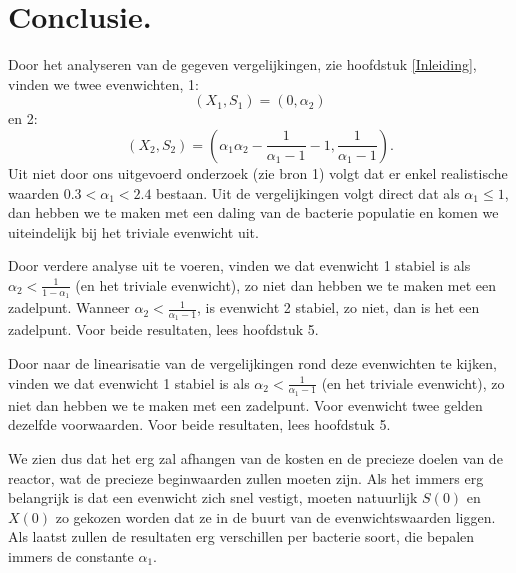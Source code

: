 
\chapter{Conclusie.}
Door het analyseren van de gegeven vergelijkingen, zie hoofdstuk \ref{Inleiding}, vinden we twee evenwichten, 1:
\[ 
	 (X_1, S_1) = (0, \alpha_2)
\]
en 2:
\[
	(X_2, S_2) =\left( \alpha_1\alpha_2 - \frac{1}{\alpha_1 - 1} - 1, \frac{1}{\alpha_1 - 1}\right).
\] 
Uit niet door ons uitgevoerd onderzoek (zie bron 1) volgt dat er enkel realistische waarden $0.3 < \alpha_1 < 2.4$ bestaan. Uit de vergelijkingen volgt direct dat als $\alpha_1 \leq 1$, dan hebben we te maken met een daling van de bacterie populatie en komen we uiteindelijk bij het triviale evenwicht uit. 

Door verdere analyse uit te voeren, vinden we dat evenwicht 1 stabiel is als $\alpha_2 < \frac{1}{1 - \alpha_1}$ (en het triviale evenwicht), zo niet dan hebben we te maken met een zadelpunt. Wanneer $\alpha_2 < \frac{1}{\alpha_1 - 1}$, is evenwicht 2 stabiel, zo niet, dan is het een zadelpunt. Voor beide resultaten, lees hoofdstuk 5. 

Door naar de linearisatie van de vergelijkingen rond deze evenwichten te kijken, vinden we dat evenwicht 1 stabiel is als $\alpha_2 < \frac{1}{\alpha_1 - 1}$ (en het triviale evenwicht), zo niet dan hebben we te maken met een zadelpunt. Voor evenwicht twee gelden dezelfde voorwaarden. Voor beide resultaten, lees hoofdstuk 5. 

We zien dus dat het erg zal afhangen van de kosten en de precieze doelen van de reactor, wat de precieze beginwaarden zullen moeten zijn. Als het immers erg belangrijk is dat een evenwicht zich snel vestigt, moeten natuurlijk $S(0)$ en $X(0)$ zo gekozen worden dat ze in de buurt van de evenwichtswaarden liggen. Als laatst zullen de resultaten erg verschillen per bacterie soort, die bepalen immers de constante $\alpha_1$. 

